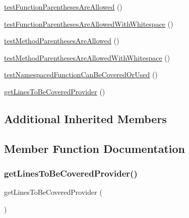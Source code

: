 \begin{DoxyCompactItemize}
\mbox{\hyperlink{class_util___test_test_a7d8b907165e36f5ce52f216e5c13a255}{test\+Function\+Parentheses\+Are\+Allowed}} ()
\item 
\mbox{\hyperlink{class_util___test_test_ab1687c69a017aa600b6c53ac4e1b8f88}{test\+Function\+Parentheses\+Are\+Allowed\+With\+Whitespace}} ()
\item 
\mbox{\hyperlink{class_util___test_test_a86609abccc13d775736a1444d379cefb}{test\+Method\+Parentheses\+Are\+Allowed}} ()
\item 
\mbox{\hyperlink{class_util___test_test_a5eaec32e011272cd50efa8d20d08b0d9}{test\+Method\+Parentheses\+Are\+Allowed\+With\+Whitespace}} ()
\item 
\mbox{\hyperlink{class_util___test_test_a644234db1259c5fcc5566274b06a2418}{test\+Namespaced\+Function\+Can\+Be\+Covered\+Or\+Used}} ()
\item 
\mbox{\hyperlink{class_util___test_test_adf9a53edbbd091afab4f8730ea0629ba}{get\+Lines\+To\+Be\+Covered\+Provider}} ()
\end{DoxyCompactItemize}
\subsection*{Additional Inherited Members}


\subsection{Member Function Documentation}
\mbox{\label{class_util___test_test_adf9a53edbbd091afab4f8730ea0629ba}} 
\subsubsection{\texorpdfstring{get\+Lines\+To\+Be\+Covered\+Provider()}{getLinesToBeCoveredProvider()}}
{\footnotesize\ttfamily get\+Lines\+To\+Be\+Covered\+Provider (\begin{DoxyParamCaption}{ }\end{DoxyParamCaption})}

\mbox{\label{class_util___test_test_a1112af8e17acda40014140dcbef0b0ef}} 
